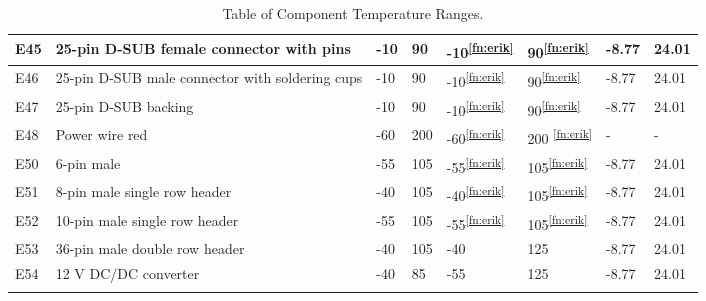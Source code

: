 \begin{longtable}{|m{1cm}|m{3.5cm}|m{1.3cm}|m{1.3cm}|m{1.4cm}|m{1.3cm}|m{1.3cm}|m{1.3cm}|}
E45 & 25-pin D-SUB female connector with pins & -10 & 90 & -10\textsuperscript{\ref{fn:erik}} & 90\textsuperscript{\ref{fn:erik}} & -8.77 & 24.01 \\ \hline
E46 & 25-pin D-SUB male connector with soldering cups & -10 & 90 & -10\textsuperscript{\ref{fn:erik}} & 90\textsuperscript{\ref{fn:erik}} & -8.77 & 24.01 \\ \hline
E47 & 25-pin D-SUB backing & -10 & 90 & -10\textsuperscript{\ref{fn:erik}} & 90\textsuperscript{\ref{fn:erik}} & -8.77 & 24.01 \\ \hline
E48 & Power wire red & -60 & 200 & -60\textsuperscript{\ref{fn:erik}} & 200
\textsuperscript{\ref{fn:erik}} & - & -  \\ \hline
E50 & 6-pin male & -55 & 105 & -55\textsuperscript{\ref{fn:erik}} & 105\textsuperscript{\ref{fn:erik}} & -8.77 & 24.01  \\ \hline
E51 & 8-pin male single row header& -40 & 105 & -40\textsuperscript{\ref{fn:erik}} & 105\textsuperscript{\ref{fn:erik}} & -8.77 & 24.01  \\ \hline
E52 & 10-pin male single row header & -55 & 105 & -55\textsuperscript{\ref{fn:erik}} & 105\textsuperscript{\ref{fn:erik}} & -8.77 & 24.01  \\ \hline
E53 & 36-pin male double row header & -40 & 105 & -40 & 125 & -8.77 & 24.01  \\ \hline
E54 & 12 V DC/DC converter & -40 & 85 & -55 & 125 & -8.77 & 24.01  \\ \hline


\caption{Table of Component Temperature Ranges.}
\label{tab:thermal-table}
\end{longtable}
\raggedbottom








